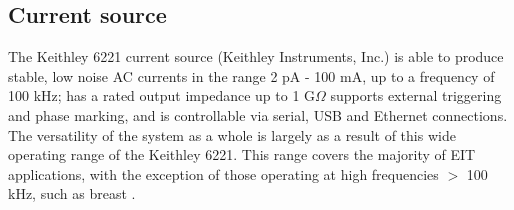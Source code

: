 \subsection{Current source}

The Keithley 6221 current source (Keithley Instruments, Inc.) is able to produce stable, low noise AC currents in the range 2 pA - 100 mA, up to a frequency of 100 kHz; has a rated output impedance up to 1 G$\Omega$ supports external triggering and phase marking, and is controllable via serial, USB and Ethernet connections. The versatility of the system as a whole is largely as a result of this wide operating range of the Keithley 6221. This range covers the majority of EIT applications, with the exception of those operating at high frequencies $>$ 100 kHz, such as breast \cite{khan}. 